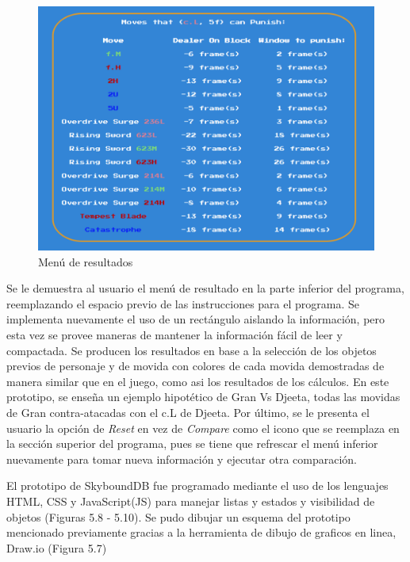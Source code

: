 \begin{center}
    \begin{figure}
        \centering
        \includegraphics[height=0.4\textheight]{figures/Results_menu-object.png}
        \caption{Menú de resultados}
        \label{fig: rslt prt}
    \end{figure}  
\end{center}

\newpage
    Se le demuestra al usuario el menú de resultado en la parte inferior del programa, reemplazando el espacio previo de las instrucciones para el programa. Se implementa nuevamente el uso de un rectángulo aislando la información, pero esta vez se provee maneras de mantener la información fácil de leer y compactada. Se producen los resultados en base a la selección de los objetos previos de personaje y de movida con colores de cada movida demostradas de manera similar que en el juego, como asi los resultados de los cálculos. En este  prototipo, se enseña un ejemplo hipotético de Gran Vs Djeeta, todas las movidas de Gran contra-atacadas con el c.L de Djeeta. Por último, se le presenta el usuario la opción de \textit{Reset} en vez de \textit{Compare} como el icono que se reemplaza en la sección superior del programa, pues se tiene que refrescar el menú inferior nuevamente para tomar nueva información y ejecutar otra comparación.

    El prototipo de SkyboundDB fue programado mediante el uso de los lenguajes HTML, CSS y JavaScript(JS) para manejar listas y estados y visibilidad de objetos (Figuras 5.8 - 5.10). Se pudo dibujar un esquema del prototipo mencionado previamente gracias a la herramienta de dibujo de graficos en linea, Draw.io (Figura 5.7)


